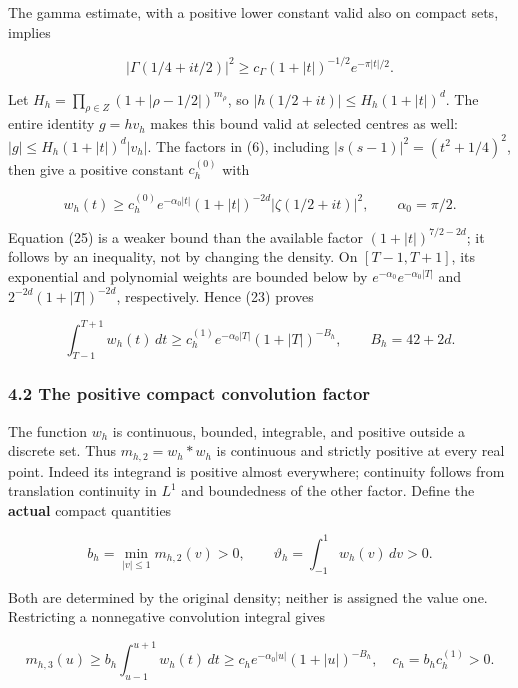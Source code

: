 The gamma estimate, with a positive lower constant valid also on compact sets, implies

\[
 |\Gamma(1/4+it/2)|^2
 \ge c_\Gamma(1+|t|)^{-1/2}e^{-\pi|t|/2}.                              \tag{24}
\]

Let \(H_h=\prod_{\rho\in Z}(1+|\rho-1/2|)^{m_\rho}\), so \(|h(1/2+it)|\le H_h(1+|t|)^d\). The entire identity \(g=hv_h\) makes this bound valid at selected centres as well: \(|g|\le H_h(1+|t|)^d|v_h|\). The factors in (6), including \(|s(s-1)|^2=(t^2+1/4)^2\), then give a positive constant \(c_h^{(0)}\) with

\[
 w_h(t)\ge c_h^{(0)}e^{-\alpha_0|t|}(1+|t|)^{-2d}
                   |\zeta(1/2+it)|^2,\qquad \alpha_0=\pi/2.            \tag{25}
\]

Equation (25) is a weaker bound than the available factor \((1+|t|)^{7/2-2d}\); it follows by an inequality, not by changing the density. On \([T-1,T+1]\), its exponential and polynomial weights are bounded below by \(e^{-\alpha_0}e^{-\alpha_0|T|}\) and \(2^{-2d}(1+|T|)^{-2d}\), respectively. Hence (23) proves

\[
 \int_{T-1}^{T+1}w_h(t)\,dt
 \ge c_h^{(1)}e^{-\alpha_0|T|}(1+|T|)^{-B_h},\qquad B_h=42+2d.          \tag{26}
\]

\subsubsection{4.2 The positive compact convolution factor}\label{zlm:endpoint-arithmetic_original--the-positive-compact-convolution-factor}

The function \(w_h\) is continuous, bounded, integrable, and positive outside a discrete set. Thus \(m_{h,2}=w_h*w_h\) is continuous and strictly positive at every real point. Indeed its integrand is positive almost everywhere; continuity follows from translation continuity in \(L^1\) and boundedness of the other factor. Define the \textbf{actual} compact quantities

\[
 b_h=\min_{|v|\le1}m_{h,2}(v)>0,\qquad
 \vartheta_h=\int_{-1}^{1}w_h(v)\,dv>0.                                 \tag{27}
\]

Both are determined by the original density; neither is assigned the value one. Restricting a nonnegative convolution integral gives

\[
 m_{h,3}(u)\ge
 b_h\int_{u-1}^{u+1}w_h(t)\,dt
 \ge c_h e^{-\alpha_0|u|}(1+|u|)^{-B_h},\quad c_h=b_hc_h^{(1)}>0.
                                                                         \tag{28}
\]

